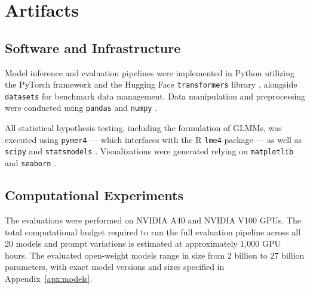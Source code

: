 \documentclass[11pt]{article}
\begin{document}
\section{Artifacts}
\subsection{Software and Infrastructure}
Model inference and evaluation pipelines were implemented in Python utilizing the PyTorch framework \citep{paszke2019pytorch} and the Hugging Face \texttt{transformers} library \citep{wolf2020huggingfacestransformersstateoftheartnatural}, alongside \texttt{datasets} \citep{lhoest-etal-2021-datasets} for benchmark data management. Data manipulation and preprocessing were conducted using \texttt{pandas} \cite{mckinney-proc-scipy-2010} and \texttt{numpy} \cite{harris2020array}.

All statistical hypothesis testing, including the formulation of GLMMs, was executed using \texttt{pymer4} \cite{jolly2018pymer4} --- which interfaces with the R \texttt{lme4} package \cite{Bates2015lme4} --- as well as \texttt{scipy} \cite{Virtanen_2020} and \texttt{statsmodels} \cite{seabold2010statsmodels}. Visualizations were generated relying on \texttt{matplotlib} \cite{Hunter:2007} and \texttt{seaborn} \cite{Waskom2021}.

\subsection{Computational Experiments}
The evaluations were performed on NVIDIA A40 and NVIDIA V100 GPUs. The total computational budget required to run the full evaluation pipeline across all 20 models and prompt variations is estimated at approximately 1,000 GPU hours. The evaluated open-weight models range in size from 2 billion to 27 billion parameters, with exact model versions and sizes specified in Appendix~\ref{apx:models}.
\end{document}
